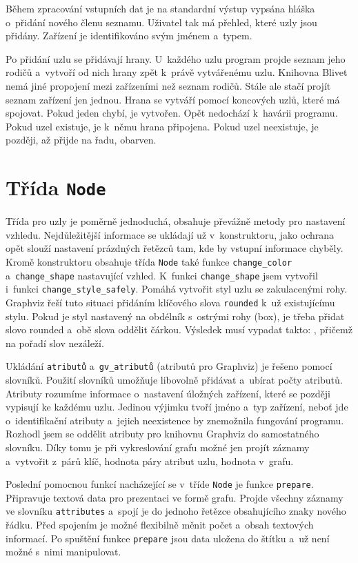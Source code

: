 \documentclass[printed,color,table,oneside,nolot,nolof]{fithesis}
\begin{document}
	Během zpracování vstupních dat je na
	standardní výstup vypsána hláška o~přidání nového členu seznamu. Uživatel tak má přehled, které uzly jsou přidány. Zařízení je identifikováno svým jménem a~typem.

	Po přidání uzlu se přidávají hrany. U~každého uzlu program projde seznam jeho rodičů a~vytvoří od nich hrany zpět k~právě vytvářenému uzlu. 
	Knihovna Blivet nemá jiné propojení mezi zařízeními než seznam rodičů. Stále ale stačí projít seznam zařízení jen jednou. Hrana se vytváří pomocí koncových uzlů, které má spojovat.
	Pokud jeden chybí, je vytvořen. Opět nedochází k~havárii programu. Pokud uzel existuje, je k~němu hrana připojena. Pokud uzel neexistuje, je později, až přijde na řadu, obarven.

\section{Třída \texttt{Node}}
	Třída pro uzly je poměrně jednoduchá, obsahuje převážně metody pro nastavení vzhledu. Nejdůležitější informace se ukládají už v~konstruktoru, jako ochrana opět slouží nastavení
	prázdných řetězců tam, kde by vstupní informace chyběly. Kromě konstruktoru obsahuje třída \texttt{Node} také funkce \texttt{change\_color} a~\texttt{change\_shape} nastavující vzhled. K~funkci 
	\texttt{change\_shape} 
	jsem vytvořil i~funkci \texttt{change\_style\_safely}. Pomáhá vytvořit styl uzlu se zakulacenými rohy. Graphviz řeší tuto situaci přidáním klíčového slova \texttt{rounded} k~už 
	existujícímu stylu. Pokud je styl nastavený na obdélník s~ostrými rohy (box), je třeba přidat slovo rounded a~obě slova oddělit čárkou. Výsledek musí vypadat takto: ,
	přičemž na pořadí slov nezáleží.

	Ukládání \texttt{atributů} a~\texttt{gv\_atributů} (atributů pro Graphviz) je řešeno pomocí slovníků. Použití slovníků umožňuje libovolně přidávat a~ubírat počty atributů. 
	Atributy rozumíme informace o~nastavení úložných zařízení, které se později vypisují ke každému uzlu. Jedinou výjimku tvoří jméno a~typ zařízení, neboť jde
	o~identifikační atributy a~jejich neexistence by znemožnila fungování programu. Rozhodl jsem se oddělit atributy pro knihovnu Graphviz do samostatného slovníku. Díky tomu je při
	vykreslování grafu možné jen projít záznamy a~vytvořit z~párů klíč, hodnota páry atribut uzlu, hodnota v~grafu. 

	Poslední pomocnou funkcí nacházející se v~tříde \texttt{Node} je funkce \texttt{prepare}. Připravuje textová data pro prezentaci ve formě grafu. Projde všechny záznamy ve slovníku \texttt{attributes} a~spojí je do 
	jednoho řetězce obsahujícího znaky nového řádku. Před spojením je možné flexibilně měnit počet a~obsah textových informací. Po spuštění funkce \texttt{prepare} jsou data uložena do štítku a~už není možné
	s~nimi manipulovat.
\end{document}
